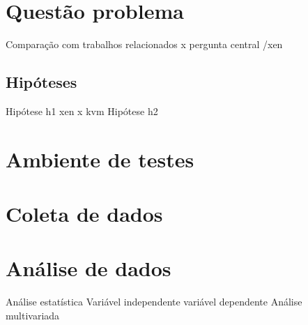 \section{Questão problema}

Comparação com trabalhos relacionados
 x pergunta central /xen
 
\subsection{Hipóteses}
 	Hipótese h1 xen x kvm
 	Hipótese h2 

\section{Ambiente de testes}

\section{Coleta de dados}

\section{Análise de dados}
Análise estatística
Variável independente
variável dependente
Análise multivariada
 	